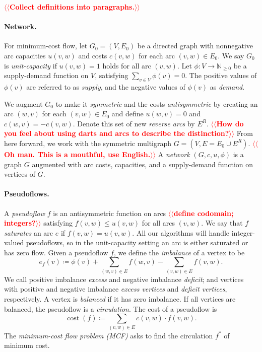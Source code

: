 \documentclass[11pt]{article}
\makeatletter
\def\ints{\mathbb{N}}
\def\fsupply{\phi}
\theoremstyle{plain}
\numberwithin{figure}{section}
\def\cost{\operatorname{cost}}
\def\n@te#1{\textsf{\boldmath \textbf{$\langle\!\langle$#1$\rangle\!\rangle$}}\leavevmode}
\def\note#1{\textcolor{red}{\n@te{#1}}}
\makeatother
\begin{document}
\note{Collect definitions into paragraphs.}

\paragraph{Network.}
For minimum-cost flow, let $G_0 = (V, E_0)$ be a directed graph with
nonnegative arc capacities $u(v, w)$ and costs $c(v, w)$ for each arc
$(v, w) \in E_0$.
We say $G_0$ is \emph{unit-capacity} if $u(v, w) = 1$ holds for all arc $(v, w)$.
Let $\fsupply: V \to \ints_{\geq 0}$ be a supply-demand function on $V$, satisfying $\sum_{v \in V} \fsupply(v) = 0$.
The positive values of $\fsupply(v)$ are referred to as \emph{supply}, and the negative values of $\fsupply(v)$ as \emph{demand}.

We augment $G_0$ to make it \emph{symmetric}
and the costs
\emph{antisymmetric}
by creating an arc $(w, v)$ for each $(v, w) \in E_0$ and define $u(w, v) = 0$ and $c(w, v) = -c(v, w)$.
Denote this set of new \emph{reverse arcs} by $E^R$.
\note{How do you feel about using darts and arcs to describe the distinction?}
From here forward, we work with the symmetric multigraph
$G = (V, E = E_0 \cup E^R)$. \note{Oh man.  This is a mouthful, use English.}
A \emph{network} $(G, c, u, \fsupply)$ is a graph $G$ augmented with arc costs, capacities, and a supply-demand function on vertices of $G$.

\paragraph{Pseudoflows.}
A \emph{pseudoflow} $f$ is an antisymmetric function on arcs \note{define codomain; integers?}
satisfying $f(v, w) \leq u(v, w)$ for all arcs $(v, w)$.
We say that $f$ \emph{saturates} an arc $e$ if $f(v, w) = u(v, w)$.
All our algorithms will handle integer-valued pseudoflows, so in the
unit-capacity setting an arc is either saturated or has zero flow.
Given a pseudoflow $f$, we define the \emph{imbalance} of a vertex to be
\[
e_f(v) \coloneqq \fsupply(v) + \sum_{(w, v) \in E}{f(w, v)} - \sum_{(v, w) \in E}{f(v, w)}.
\]
We call positive imbalance \emph{excess} and negative imbalance \emph{deficit}; and
vertices with positive and negative imbalance \emph{excess vertices} and \emph{deficit vertices}, respectively.
A vertex is \emph{balanced} if it has zero imbalance.
If all vertices are balanced, the pseudoflow is a \emph{circulation}.
The cost of a pseudoflow is
\[
\cost(f) \coloneqq \sum_{(v, w) \in E} c(v, w) \cdot f(v, w).
\]
The \emph{minimum-cost flow problem (MCF)} asks to find the circulation $f^*$ of
minimum cost.
\end{document}
